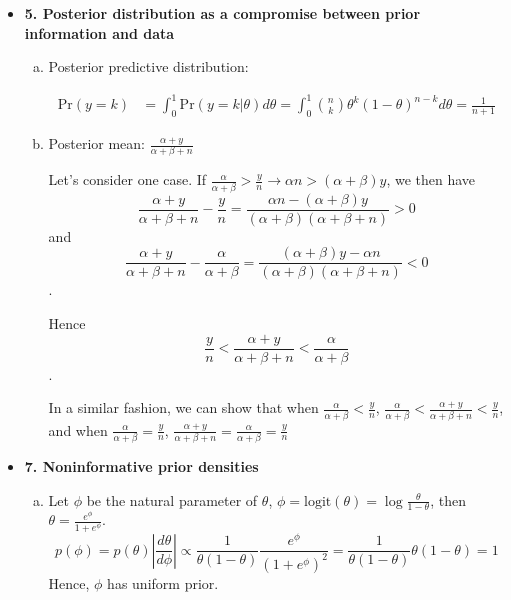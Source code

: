 \documentclass{article}
\begin{document}
\begin{itemize}
\item \textbf{5. Posterior distribution as a compromise between prior information and data}

\begin{enumerate}[(a)]

\item Posterior predictive distribution:

\begin{align}
\text{Pr}(y=k) &= \int_0^1 \text{Pr}(y=k|\theta) d\theta = \int_0^1 \binom{n}{k} \theta^k (1-\theta)^{n-k} d\theta = \frac{1}{n+1}
\end{align}

\item Posterior mean:
$
\frac{\alpha + y}{\alpha + \beta + n}
$

Let's consider one case. If $\frac{\alpha}{\alpha + \beta} > \frac{y}{n} \rightarrow \alpha n > (\alpha+\beta)y$, we then have
$$
\frac{\alpha+y}{\alpha+\beta+n} - \frac{y}{n} = \frac{\alpha n -(\alpha+\beta)y}{(\alpha + \beta)(\alpha + \beta+n)} > 0
$$
and 
$$
\frac{\alpha+y}{\alpha+\beta+n} - \frac{\alpha}{\alpha + \beta} = \frac{(\alpha+\beta)y - \alpha n}{(\alpha + \beta)(\alpha + \beta+n)} < 0
$$.

Hence
$$\frac{y}{n} <\frac{\alpha+y}{\alpha + \beta+n} < \frac{\alpha}{\alpha + \beta}$$.

In a similar fashion, we can show that when $\frac{\alpha}{\alpha + \beta} < \frac{y}{n}$, $\frac{\alpha}{\alpha + \beta} <  \frac{\alpha+y}{\alpha + \beta+n} < \frac{y}{n}$, and when $\frac{\alpha}{\alpha + \beta} = \frac{y}{n}$, $\frac{\alpha+y}{\alpha + \beta+n} = \frac{\alpha}{\alpha + \beta} = \frac{y}{n}$

\end{enumerate}


\item \textbf{7. Noninformative prior densities}
\begin{enumerate}[(a)]

\item Let $\phi$ be the natural parameter of $\theta$, $\phi = \text{logit}(\theta) = \log \frac{\theta}{1-\theta}$, then $\theta = \frac{e^{\phi}}{1 + e^{\phi}}$.
$$
p(\phi) = p(\theta) \left | \frac{d\theta}{d\phi} \right| \propto \frac{1}{\theta(1-\theta)} \frac{e^{\phi}}{(1+e^{\phi})^2} = \frac{1}{\theta(1-\theta)} \theta (1-\theta) = 1
$$
Hence, $\phi$ has uniform prior.


\end{enumerate}
\end{itemize}
\end{document}
